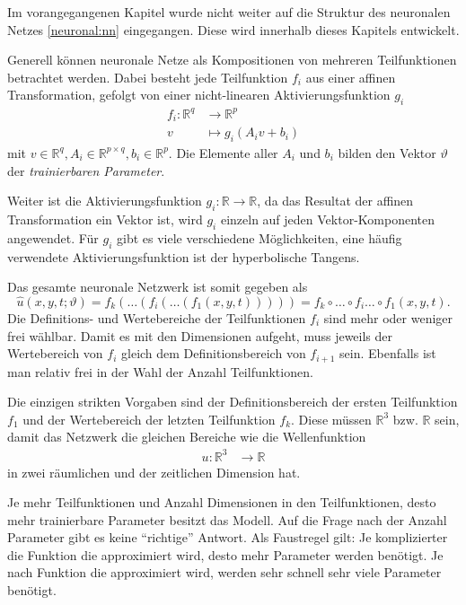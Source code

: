 Im vorangegangenen Kapitel wurde nicht weiter auf die Struktur des neuronalen Netzes \eqref{neuronal:nn} eingegangen.
Diese wird innerhalb dieses Kapitels entwickelt.

Generell können neuronale Netze als Kompositionen von mehreren Teilfunktionen betrachtet werden.
Dabei besteht jede Teilfunktion \( f_i \) aus einer affinen Transformation, gefolgt von einer nicht-linearen Aktivierungsfunktion \( g_i \)
\begin{align*}
    f_i\colon \mathbb{R}^q & \longrightarrow\mathbb{R}^p \\[-1ex]
    v & \longmapsto g_i(A_iv + b_i)
\end{align*}
mit \( v \in \mathbb{R}^q, A_i \in \mathbb{R}^{p \times q}, b_i \in \mathbb{R}^p \). 
Die Elemente aller \( A_i \) und \( b_i \) bilden den Vektor \( \vartheta \) der \emph{trainierbaren Parameter}.

Weiter ist die Aktivierungsfunktion \( g_i\colon \mathbb{R} \longrightarrow\mathbb{R} \), da das Resultat der affinen Transformation ein Vektor ist, wird \( g_i \) einzeln auf jeden Vektor-Komponenten angewendet.
Für \( g_i \) gibt es viele verschiedene Möglichkeiten, eine häufig verwendete Aktivierungsfunktion ist der hyperbolische Tangens.

Das gesamte neuronale Netzwerk ist somit gegeben als
\begin{equation}
    \hat{u}(x, y, t; \vartheta) = f_k(\ldots(f_i(\ldots(f_1(x, y, t))))) = f_k \circ \ldots \circ f_i \ldots \circ f_1(x, y, t).
    \label{neuronal:nn_ausformuliert}
\end{equation}
Die Definitions- und Wertebereiche der Teilfunktionen \( f_i \) sind mehr oder weniger frei wählbar.
Damit es mit den Dimensionen aufgeht, muss jeweils der Wertebereich von \( f_i \) gleich dem Definitionsbereich von \( f_{i+1} \) sein.
Ebenfalls ist man relativ frei in der Wahl der Anzahl Teilfunktionen.

Die einzigen strikten Vorgaben sind der Definitionsbereich der ersten Teilfunktion \( f_1 \) und der Wertebereich der letzten Teilfunktion \( f_k \).
Diese müssen \( \mathbb{R}^3 \) bzw. \( \mathbb{R} \) sein, damit das Netzwerk die gleichen Bereiche wie die Wellenfunktion
\begin{align*}
    u\colon \mathbb{R}^3 & \longrightarrow\mathbb{R}
\end{align*}
in zwei räumlichen und der zeitlichen Dimension hat.

Je mehr Teilfunktionen und Anzahl Dimensionen in den Teilfunktionen, desto mehr trainierbare Parameter besitzt das Modell.
Auf die Frage nach der Anzahl Parameter gibt es keine ``richtige'' Antwort.
Als Faustregel gilt: Je komplizierter die Funktion die approximiert wird, desto mehr Parameter werden benötigt.
Je nach Funktion die approximiert wird, werden sehr schnell sehr viele Parameter benötigt.

